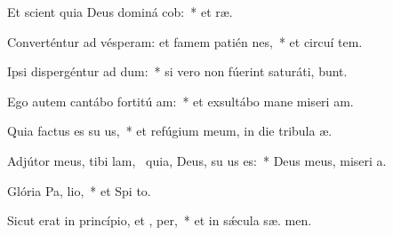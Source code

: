 \item Et scient quia Deus dominá cob:~* et  ræ.
\item Converténtur ad vésperam: et famem patién  nes,~* et circuí tem.
\item Ipsi dispergéntur ad dum:~* si vero non fúerint saturáti,  bunt.
\item Ego autem cantábo fortitú am:~* et exsultábo mane miseri am.
\item Quia factus es su us,~* et refúgium meum, in die tribula æ.
\item Adjútor meus, tibi lam,~\pscross{} quia, Deus, su us es:~* Deus meus, miseri a.
\item Glória Pa,  lio,~* et Spi to.
\item Sicut erat in princípio, et ,  per,~* et in sǽcula sæ. men.
